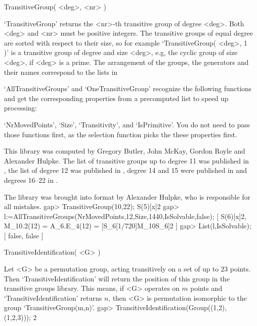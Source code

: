 \>TransitiveGroup( <deg>, <nr> )

`TransitiveGroup'  returns the <nr>-th transitive  group of degree <deg>.
Both  <deg> and <nr> must be  positive integers. The transitive groups of
equal  degree are  sorted with  respect to   their  size, so for  example
`TransitiveGroup(  <deg>, 1 )' is a  transitive group  of degree and size
<deg>, e.g, the cyclic  group  of size <deg>,   if <deg> is a  prime. The
arrangement of  the groups, the  generators and their names correspond to
the lists in \cite{ConwayHulpkeMcKay97}

`AllTransitiveGroups'  and `OneTransitiveGroup'   recognize the following
functions and get the corresponding properties from a precomputed list to
speed up  processing:

`NrMovedPoints', `Size',   `Transitivity', and `IsPrimitive'.  You do not
need to pass  those functions first, as  the selection function picks the
these properties first.

This library was computed by Gregory Butler, John McKay, Gordon Royle and
Alexander  Hulpke. The list  of transitive  groups  up to  degree  11 was
published in \cite{ButlerMcKay83}, the list of degree 12 was published in
\cite{Royle87}, degree 14 and   15 were published in \cite{Butler93}  and
degrees 16--22 in \cite{Hulpke96}.

The library was  brought into {\GAP} format by  Alexander  Hulpke, who is
responsible for all mistakes.
\beginexample
    gap> TransitiveGroup(10,22);
    S(5)[x]2
    gap> l:=AllTransitiveGroups(NrMovedPoints,12,Size,1440,IsSolvable,false);
    [ S(6)[x]2, M_10.2(12) = A_6.E_4(12) = [S_6[1/720]{M_10}S_6]2 ]
    gap> List(l,IsSolvable);
    [ false, false ]
\endexample

\>TransitiveIdentification( <G> )

Let <G> be a permutation group, acting transitively on a set  of up to 23
points.  Then `TransitiveIdentification' will return the position of this
group in the transitive  groups library.  This means,  if <G> operates on
$m$ points and    `TransitiveIdentification'  returns $n$,  then <G>   is
permutation isomorphic to the group `TransitiveGroup(m,n)'.
\beginexample
    gap> TransitiveIdentification(Group((1,2),(1,2,3)));
    2
\endexample

%

